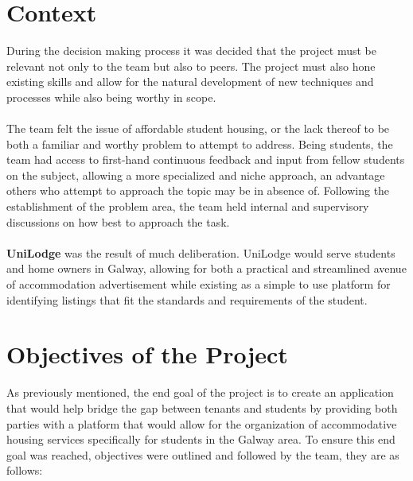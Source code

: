\section{Context}
During the decision making process it was decided that the project must be relevant not only to the team but also to peers. The project must also hone existing skills and allow for the natural development of new techniques and processes while also being worthy in scope. 

\paragraph{}
The team felt the issue of affordable student housing, or the lack thereof to be both a familiar and worthy problem to attempt to address. Being students, the team had access to first-hand continuous feedback and input from fellow students on the subject, allowing a more specialized and niche approach, an advantage others who attempt to approach the topic may be in absence of. Following the establishment of the problem area, the team held internal and supervisory discussions on how best to approach the task.

\paragraph{}
\textbf{UniLodge} was the result of much deliberation. UniLodge would serve students and home owners in Galway, allowing for both a practical and streamlined avenue of accommodation advertisement while existing as a simple to use platform for identifying listings that fit the standards and requirements of the student. 
\section{Objectives of the Project}
As previously mentioned, the end goal of the project is to create an application that would help bridge the gap between tenants and students by providing both parties with a platform that would allow for the organization of accommodative housing services specifically for students in the Galway area. To ensure this end goal was reached, objectives were outlined and followed by the team, they are as follows:

